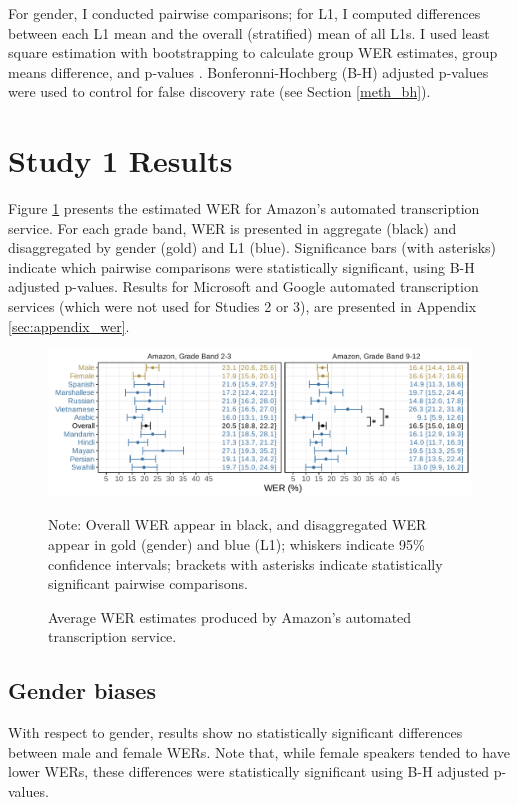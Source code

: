 \documentclass [PhD] {uclathes}
\begin{document}
For gender, I conducted pairwise comparisons; for L1, I computed differences between each L1 mean and the overall (stratified) mean of all L1s. I used least square estimation with bootstrapping to calculate group WER estimates, group means difference, and p-values \citep{tibshirani1993}. Bonferonni-Hochberg (B-H) adjusted p-values were used to control for false discovery rate (see Section \ref{meth_bh}).

\section{Study 1 Results}

Figure \ref{wer_aws} presents the estimated WER for Amazon’s automated transcription service. For each grade band, WER is presented in aggregate (black) and disaggregated by gender (gold) and L1 (blue). Significance bars (with asterisks) indicate which pairwise comparisons were statistically significant, using B-H adjusted p-values. Results for Microsoft and Google automated transcription services (which were not used for Studies 2 or 3), are presented in Appendix \ref{sec:appendix_wer}. 

\begin{figure}[h]
    \centering
    \caption{Average WER estimates produced by Amazon’s automated transcription service.}
    \includegraphics[width=6.5in]{figures/20230513_adj_werPlot_sigBars_aws.pdf}
    \label{wer_aws}
{Note: Overall WER appear in black, and disaggregated WER appear in gold (gender) and blue (L1); whiskers indicate 95\% confidence intervals; brackets with asterisks indicate statistically significant pairwise comparisons. \par}
\end{figure}


\subsection{Gender biases}

With respect to gender, results show no statistically significant differences between male and female WERs. Note that, while female speakers tended to have lower WERs, these differences were statistically significant using B-H adjusted p-values.
\end{document}

